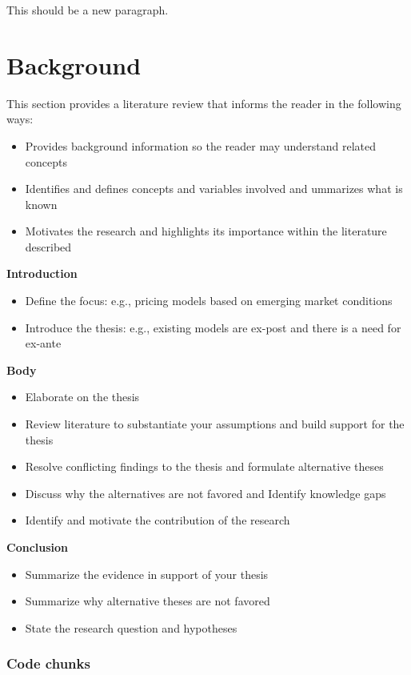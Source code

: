 \documentclass[12pt,oneside]{chicagocapstone}
\providecommand{\tightlist}{%
  \setlength{\itemsep}{0pt}\setlength{\parskip}{0pt}}
\begin{document}
This should be a new paragraph.

\hypertarget{background}{%
\chapter*{Background}\label{background}}

This section provides a literature review that informs the reader in the following ways:
\begin{itemize}
\tightlist
\item
  Provides background information so the reader may understand related concepts
\item
  Identifies and defines concepts and variables involved and ummarizes what is known
\item
  Motivates the research and highlights its importance within the literature described
\end{itemize}
\textbf{Introduction}
\begin{itemize}
\tightlist
\item
  Define the focus: e.g., pricing models based on emerging market conditions
\item
  Introduce the thesis: e.g., existing models are ex-post and there is a need for ex-ante
\end{itemize}
\textbf{Body}
\begin{itemize}
\tightlist
\item
  Elaborate on the thesis
\item
  Review literature to substantiate your assumptions and build support for the thesis
\item
  Resolve conflicting findings to the thesis and formulate alternative theses
\item
  Discuss why the alternatives are not favored and Identify knowledge gaps
\item
  Identify and motivate the contribution of the research
\end{itemize}
\textbf{Conclusion}
\begin{itemize}
\tightlist
\item
  Summarize the evidence in support of your thesis
\item
  Summarize why alternative theses are not favored
\item
  State the research question and hypotheses
\end{itemize}
\newpage

\hypertarget{code-chunks}{%
\subsection*{Code chunks}\label{code-chunks}}
\end{document}
